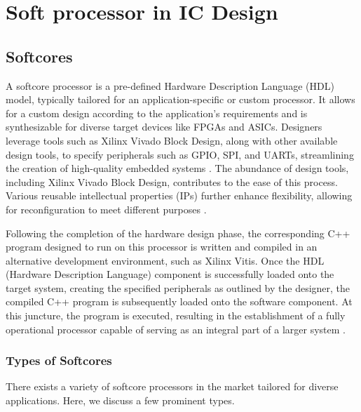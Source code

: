 \documentclass[conference]{IEEEtran}
\begin{document}
\section{Soft processor in IC Design}


\subsection{Softcores}
A softcore processor is a pre-defined Hardware Description Language (HDL) model, typically tailored for an application-specific or custom processor. It allows for a custom design according to the application's requirements and is synthesizable for diverse target devices like FPGAs and ASICs. Designers leverage tools such as Xilinx Vivado Block Design, along with other available design tools, to specify peripherals such as GPIO, SPI, and UARTs, streamlining the creation of high-quality embedded systems \cite{4}. The abundance of design tools, including Xilinx Vivado Block Design, contributes to the ease of this process. Various reusable intellectual properties (IPs) further enhance flexibility, allowing for reconfiguration to meet different purposes \cite{3}.

Following the completion of the hardware design phase, the corresponding C++ program designed to run on this processor is written and compiled in an alternative development environment, such as Xilinx Vitis. Once the HDL (Hardware Description Language) component is successfully loaded onto the target system, creating the specified peripherals as outlined by the designer, the compiled C++ program is subsequently loaded onto the software component. At this juncture, the program is executed, resulting in the establishment of a fully operational processor capable of serving as an integral part of a larger system \cite{3}.

\subsubsection{Types of Softcores}

There exists a variety of softcore processors in the market tailored for diverse applications. Here, we discuss a few prominent types.
\end{document}
